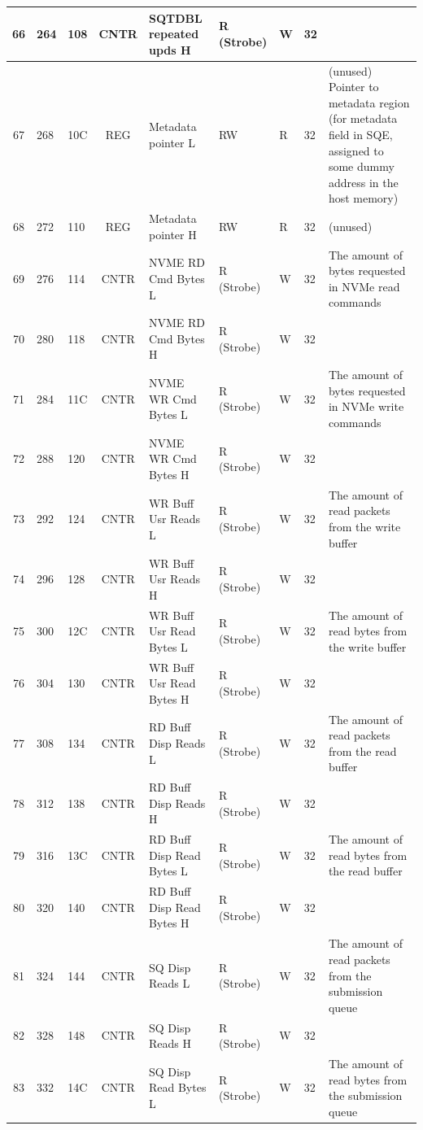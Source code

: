 \begin{landscape}
\begin{longtable}{|c|p{1.1cm}|p{1.1cm}|c|p{5.1cm}|p{1.4cm}|p{1.3cm}|p{1.3cm}|p{6cm}|}
66 & 264 & 108 & CNTR & SQTDBL repeated upds H & R (Strobe) & W & 32 &  \\ \hline
67 & 268 & 10C & REG & Metadata pointer L & RW & R & 32 & (unused) Pointer to metadata region (for metadata field in SQE, assigned to some dummy address in the host memory) \\ \hline
68 & 272 & 110 & REG & Metadata pointer H & RW & R & 32 & (unused) \\ \hline
69 & 276 & 114 & CNTR & NVME RD Cmd Bytes L & R (Strobe) & W & 32 & The amount of bytes requested in NVMe read commands \\ \hline
70 & 280 & 118 & CNTR & NVME RD Cmd Bytes H & R (Strobe) & W & 32 &  \\ \hline
71 & 284 & 11C & CNTR & NVME WR Cmd Bytes L & R (Strobe) & W & 32 & The amount of bytes requested in NVMe write commands \\ \hline
72 & 288 & 120 & CNTR & NVME WR Cmd Bytes H & R (Strobe) & W & 32 &  \\ \hline
73 & 292 & 124 & CNTR & WR Buff Usr Reads L & R (Strobe) & W & 32 & The amount of read packets from the write buffer \\ \hline
74 & 296 & 128 & CNTR & WR Buff Usr Reads H & R (Strobe) & W & 32 &  \\ \hline
75 & 300 & 12C & CNTR & WR Buff Usr Read Bytes L & R (Strobe) & W & 32 & The amount of read bytes from the write buffer \\ \hline
76 & 304 & 130 & CNTR & WR Buff Usr Read Bytes H & R (Strobe) & W & 32 &  \\ \hline
77 & 308 & 134 & CNTR & RD Buff Disp Reads L & R (Strobe) & W & 32 & The amount of read packets from the read buffer \\ \hline
78 & 312 & 138 & CNTR & RD Buff Disp Reads H & R (Strobe) & W & 32 &  \\ \hline
79 & 316 & 13C & CNTR & RD Buff Disp Read Bytes L & R (Strobe) & W & 32 & The amount of read bytes from the read buffer \\ \hline
80 & 320 & 140 & CNTR & RD Buff Disp Read Bytes H & R (Strobe) & W & 32 &  \\ \hline
81 & 324 & 144 & CNTR & SQ Disp Reads L & R (Strobe) & W & 32 & The amount of read packets from the submission queue \\ \hline
82 & 328 & 148 & CNTR & SQ Disp Reads H & R (Strobe) & W & 32 &  \\ \hline
83 & 332 & 14C & CNTR & SQ Disp Read Bytes L & R (Strobe) & W & 32 & The amount of read bytes from the submission queue \\ \hline

\end{longtable}
\end{landscape}
